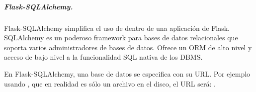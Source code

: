 \begin{sphinxVerbatim}[commandchars=\\\{\}]
     
          
            
          
        \PYG{p}{[}\PYG{p}{]}   \PYG{p}{[}\PYG{p}{]}
         \PYG{p}{[}\PYG{p}{]} 

 
 


   
\end{sphinxVerbatim}


\subparagraph{Flask-SQLAlchemy.}
\label{\detokenize{chapter_two/desc_cloudnao:flask-sqlalchemy}}
Flask-SQLAlchemy simplifica el uso de  dentro de una aplicación de
Flask. SQLAlchemy es un  poderoso framework para bases de datos relacionales
que soporta varios administradores de bases de datos. Ofrece un ORM de alto
nivel y acceso de bajo nivel a la funcionalidad SQL nativa de los DBMS.

En Flask-SQLAlchemy, una base de datos se especifica con su URL. Por ejemplo
usando , que en realidad es sólo un archivo en el disco, el URL
será: .

